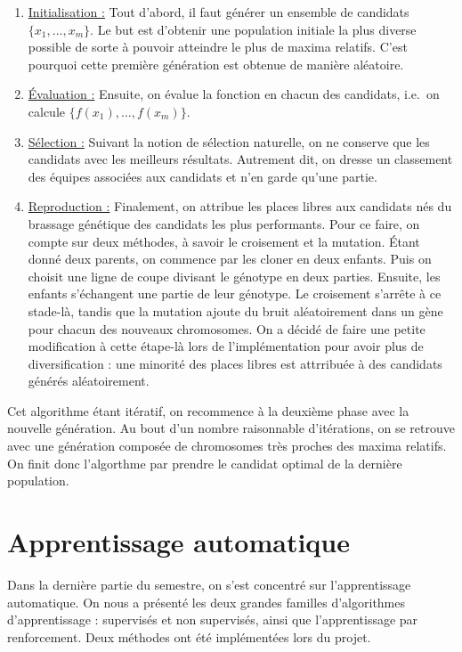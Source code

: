 \documentclass[12pt,a4paper]{article}
\begin{document}
\begin{enumerate}
\item \underline{Initialisation :} Tout d'abord, il faut g\'en\'erer un 
ensemble de candidats $\{x_1,\dotsc,x_m\}$. Le but est d'obtenir une population 
initiale la plus diverse possible de sorte \`a pouvoir atteindre le plus de 
maxima relatifs. C'est pourquoi cette premi\`ere g\'en\'eration est obtenue de 
mani\`ere al\'eatoire.
\item \underline{\'Evaluation :} Ensuite, on \'evalue la fonction en 
chacun des candidats, i.e.\ on calcule $\{f(x_1),\dotsc,f(x_m)\}$.
\item \underline{S\'election :} Suivant la notion de s\'election 
naturelle, on ne conserve que les candidats avec les meilleurs r\'esultats. 
Autrement dit, on dresse un classement des \'equipes associ\'ees aux candidats 
et n'en garde qu'une partie.
\item \underline{Reproduction :} Finalement, on attribue les places 
libres aux candidats n\'es du brassage g\'en\'etique des candidats les 
plus performants. Pour ce faire, on compte sur deux m\'ethodes, \`a savoir le 
croisement et la mutation. \'Etant donn\'e deux parents, on commence par les 
cloner en deux enfants. Puis on choisit une ligne de coupe divisant le 
g\'enotype en deux parties. Ensuite, les enfants s'\'echangent une partie de 
leur g\'enotype. Le croisement s'arr\^ete \`a ce stade-l\`a, tandis que la 
mutation ajoute du bruit al\'eatoirement dans un g\`ene pour chacun 
des nouveaux chromosomes. On a d\'ecid\'e de faire une petite modification \`a 
cette \'etape-l\`a lors de l'impl\'ementation pour avoir plus de 
diversification : une minorit\'e des places libres est attrribu\'ee \`a des 
candidats g\'en\'er\'es al\'eatoirement.
\end{enumerate}

Cet algorithme \'etant it\'eratif, on recommence \`a la deuxi\`eme phase avec 
la nouvelle g\'en\'eration. Au bout d'un nombre raisonnable d'it\'erations, on 
se retrouve avec une g\'en\'eration compos\'ee de chromosomes tr\`es proches des 
maxima relatifs. On finit donc l'algorthme par prendre le candidat optimal de la 
derni\`ere population.  

\section{Apprentissage automatique}
Dans la derni\`ere partie du semestre, on s'est concentr\'e sur l'apprentissage 
automatique. On nous a pr\'esent\'e les deux grandes familles 
d'algorithmes d'apprentissage : supervis\'es et non supervis\'es, ainsi que 
l'apprentissage par renforcement. Deux m\'ethodes ont \'et\'e impl\'ement\'ees 
lors du projet.
\end{document}
